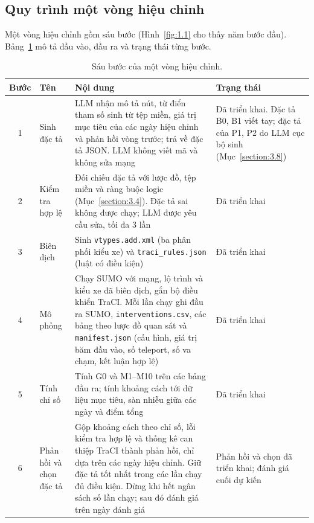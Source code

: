 \documentclass[../DoAn.tex]{subfiles}
\begin{document}
\subsection{Quy trình một vòng hiệu chỉnh}
\label{subsection:2.2.2}

Một vòng hiệu chỉnh gồm sáu bước (Hình~\ref{fig:1.1} cho thấy năm bước đầu). Bảng~\ref{table:2.4} mô tả đầu vào, đầu ra và trạng thái từng bước.

\begin{table}[ht]
\centering
\small
\caption{Sáu bước của một vòng hiệu chỉnh.}
\label{table:2.4}
\begin{tabular}{|c|p{2.6cm}|p{5.4cm}|p{5cm}|}
\hline
\textbf{Bước} & \textbf{Tên} & \textbf{Nội dung} & \textbf{Trạng thái} \\
\hline
1 & Sinh đặc tả & LLM nhận mô tả nút, từ điển tham số sinh từ tệp miền, giá trị mục tiêu của các ngày hiệu chỉnh và phản hồi vòng trước; trả về đặc tả JSON. LLM không viết mã và không sửa mạng & Đã triển khai. Đặc tả B0, B1 viết tay; đặc tả của P1, P2 do LLM cục bộ sinh (Mục~\ref{section:3.8}) \\
\hline
2 & Kiểm tra hợp lệ & Đối chiếu đặc tả với lược đồ, tệp miền và ràng buộc logic (Mục~\ref{section:3.4}). Đặc tả sai không được chạy; LLM được yêu cầu sửa, tối đa 3 lần & Đã triển khai \\
\hline
3 & Biên dịch & Sinh \texttt{vtypes.add.xml} (ba phân phối kiểu xe) và \texttt{traci\_rules.json} (luật có điều kiện) & Đã triển khai \\
\hline
4 & Mô phỏng & Chạy SUMO với mạng, lộ trình và kiểu xe đã biên dịch, gắn bộ điều khiển TraCI. Mỗi lần chạy ghi đầu ra SUMO, \texttt{interventions.csv}, các bảng theo lược đồ quan sát và \texttt{manifest.json} (cấu hình, giá trị băm đầu vào, số teleport, số va chạm, kết luận hợp lệ) & Đã triển khai \\
\hline
5 & Tính chỉ số & Tính G0 và M1--M10 trên các bảng đầu ra; tính khoảng cách tới dữ liệu mục tiêu, sàn nhiễu giữa các ngày và điểm tổng & Đã triển khai \\
\hline
6 & Phản hồi và chọn đặc tả & Gộp khoảng cách theo chỉ số, lỗi kiểm tra hợp lệ và thống kê can thiệp TraCI thành phản hồi, chỉ dựa trên các ngày hiệu chỉnh. Giữ đặc tả tốt nhất trong các lần chạy đủ điều kiện. Dừng khi hết ngân sách số lần chạy; sau đó đánh giá trên ngày đánh giá & Phản hồi và chọn đã triển khai; đánh giá cuối dự kiến \\
\hline
\end{tabular}
\end{table}
\end{document}
